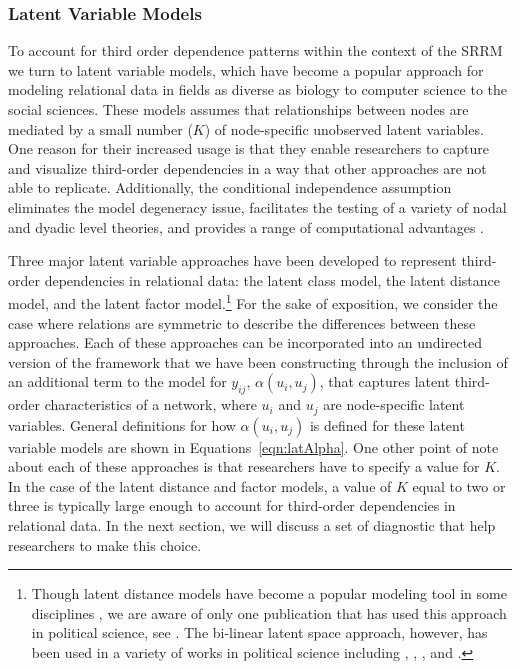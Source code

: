\documentclass[12pt,pdflatex]{elsarticle}
\begin{document}
\subsubsection{\textbf{Latent Variable Models}}

To account for third order dependence patterns within the context of the SRRM we turn to latent variable models, which have become a popular approach for modeling relational data in fields as diverse as biology to computer science to the social sciences. These models assumes that relationships between nodes are mediated by a small number ($K$) of node-specific unobserved latent variables. One reason for their increased usage is that they enable researchers to capture and visualize third-order dependencies in a way that other approaches are not able to replicate. Additionally, the conditional independence assumption eliminates the model degeneracy issue, facilitates the testing of a variety of nodal and dyadic level theories, and provides a range of computational advantages \citep{hunter:etal:2012}. 

Three major latent variable approaches have been developed to represent third-order dependencies in relational data: the latent class model, the latent distance model, and the latent factor model.\footnote{Though latent distance models have become a popular modeling tool in some disciplines \citep{salter:etal:2012}, we are aware of only one publication that has used this approach in political science, see \citet{kirkland:2012}. The bi-linear latent space approach, however, has been used in a variety of works in political science including \citet{ward:etal:2007}, \citet{cao:2009}, \citet{breunig:etal:2012}, and \citet{metternich:etal:2015}.} For the sake of exposition, we consider the case where relations are symmetric to describe the differences between these approaches. Each of these approaches can be incorporated into an undirected version of the framework that we have been constructing through the inclusion of an additional term to the model for $y_{ij}$, $\alpha(u_{i}, u_{j})$, that captures latent third-order characteristics of a network, where $u_{i}$ and $u_{j}$ are node-specific latent variables. General definitions for how $\alpha(u_{i}, u_{j})$ is defined for these latent variable models are shown in Equations~\ref{eqn:latAlpha}. One other point of note about each of these approaches is that researchers have to specify a value for $K$. In the case of the latent distance and factor models, a value of $K$ equal to two or three is typically large enough to account for third-order dependencies in relational data. In the next section, we will discuss a set of diagnostic that help researchers to make this choice.
\end{document}
